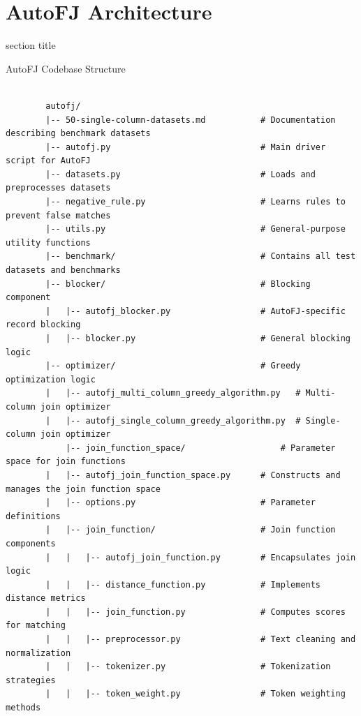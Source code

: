 \documentclass[8pt]{beamer} %
\begin{document}
\section{AutoFJ Architecture}

\begin{frame}[plain]
	\begin{beamercolorbox}[wd=\paperwidth,ht=0.7\paperheight,dp=2ex,center]{section title}
		\Huge \textbf{\insertsection}
	\end{beamercolorbox}
\end{frame}

\begin{frame}[fragile]{AutoFJ Codebase Structure}
	\begin{verbatim}
		
		autofj/
		|-- 50-single-column-datasets.md           # Documentation describing benchmark datasets
		|-- autofj.py                              # Main driver script for AutoFJ
		|-- datasets.py                            # Loads and preprocesses datasets
		|-- negative_rule.py                       # Learns rules to prevent false matches
		|-- utils.py                               # General-purpose utility functions
		|-- benchmark/                             # Contains all test datasets and benchmarks
		|-- blocker/                               # Blocking component
		|   |-- autofj_blocker.py                  # AutoFJ-specific record blocking
		|   |-- blocker.py                         # General blocking logic
		|-- optimizer/                             # Greedy optimization logic
		|   |-- autofj_multi_column_greedy_algorithm.py   # Multi-column join optimizer
		|   |-- autofj_single_column_greedy_algorithm.py  # Single-column join optimizer
			|-- join_function_space/                   # Parameter space for join functions
		|   |-- autofj_join_function_space.py      # Constructs and manages the join function space
		|   |-- options.py                         # Parameter definitions
		|   |-- join_function/                     # Join function components
		|   |   |-- autofj_join_function.py        # Encapsulates join logic
		|   |   |-- distance_function.py           # Implements distance metrics
		|   |   |-- join_function.py               # Computes scores for matching
		|   |   |-- preprocessor.py                # Text cleaning and normalization
		|   |   |-- tokenizer.py                   # Tokenization strategies
		|   |   |-- token_weight.py                # Token weighting methods
	\end{verbatim}
\end{frame}
\end{document}
